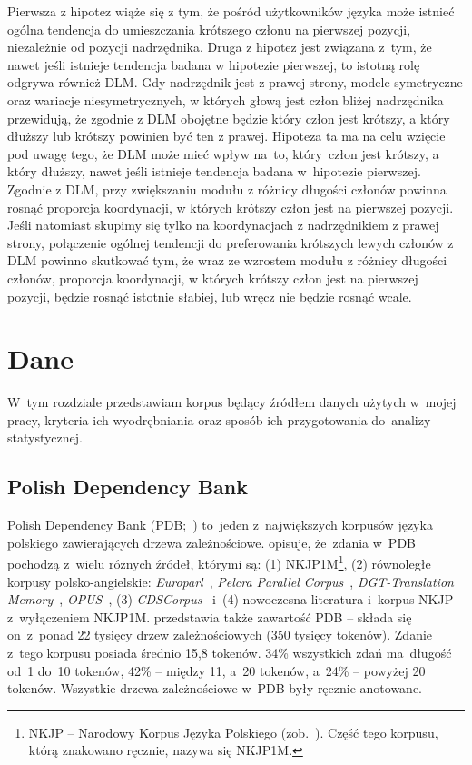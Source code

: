 \documentclass[licencjacka]{pracamgr_Kogni}
\begin{document}
    Pierwsza z hipotez wiąże się z tym, że pośród użytkowników języka może istnieć ogólna tendencja do umieszczania krótszego członu na pierwszej pozycji, niezależnie od pozycji nadrzędnika.
    Druga z hipotez jest związana z~tym, że nawet jeśli istnieje tendencja badana w hipotezie pierwszej, to istotną rolę odgrywa również DLM. 
    Gdy nadrzędnik jest z prawej strony, modele symetryczne oraz wariacje niesymetrycznych, w których głową jest człon bliżej nadrzędnika przewidują, że zgodnie z DLM obojętne będzie który człon jest krótszy, a który dłuższy lub krótszy powinien być ten z prawej.
    Hipoteza ta ma na celu wzięcie pod uwagę tego, że DLM może mieć wpływ na~to, który~człon jest krótszy, a który dłuższy, nawet jeśli istnieje tendencja badana w~hipotezie pierwszej.
    Zgodnie z DLM, przy zwiększaniu modułu z różnicy długości członów powinna rosnąć proporcja koordynacji, w których krótszy człon jest na pierwszej pozycji.
    Jeśli natomiast skupimy się tylko na koordynacjach z nadrzędnikiem z prawej strony, połączenie ogólnej tendencji do preferowania krótszych lewych członów z DLM powinno skutkować tym, że wraz ze wzrostem modułu z różnicy długości członów, proporcja koordynacji, w których krótszy człon jest na pierwszej pozycji, będzie rosnąć istotnie słabiej, lub wręcz nie będzie rosnąć wcale.

    \chapter{Dane}\label{ch:dane}
    W~tym rozdziale przedstawiam korpus będący źródłem danych użytych w~mojej pracy, kryteria ich wyodrębniania oraz sposób ich przygotowania do~analizy statystycznej.


    \section{Polish Dependency Bank}\label{sec:polish-dependency-bank}

    Polish Dependency Bank (PDB;~\citealp{Wroblewska2014}) to~jeden z~największych korpusów języka polskiego zawierających drzewa zależnościowe. \citet{Wroblewska2020} opisuje, że~zdania w~PDB pochodzą z~wielu różnych źródeł, którymi są: (1) NKJP1M\footnote{NKJP -- Narodowy Korpus Języka Polskiego (zob.~\citealt{Przepiorkowski2012}). Część tego korpusu, którą znakowano ręcznie, nazywa się NKJP1M.}, (2) równoległe korpusy polsko-angielskie: \textit{Europarl}~\citep{Koehn2005}, \textit{Pelcra Parallel Corpus}~\citep{Pezik2011}, \textit{DGT-Translation Memory}~\citep{Steinberger2012}, \textit{OPUS}~\citep{Tiedemann2012}, (3) \textit{CDSCorpus}~\citep{Wroblewska2017} i~(4) nowoczesna literatura i~korpus NKJP z~wyłączeniem NKJP1M\@.
    \citet{Wroblewska2020} przedstawia także zawartość PDB -- składa się on~z~ponad 22 tysięcy drzew zależnościowych (350 tysięcy tokenów).
    Zdanie z~tego korpusu posiada średnio 15,8 tokenów.
    34\% wszystkich zdań ma~długość od~1 do~10 tokenów, 42\% -- między 11, a~20 tokenów, a~24\% -- powyżej 20 tokenów.
    Wszystkie drzewa zależnościowe w~PDB były ręcznie anotowane.
\end{document}
